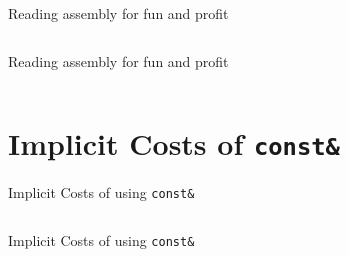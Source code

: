 \begin{frame}[fragile]{Reading assembly for fun and profit}
    \begin{columns}[t]
        \begin{column}{.45\textwidth}

        \end{column}
        \begin{column}{.45\textwidth}
        \end{column}
    \end{columns}

\end{frame}

\begin{frame}[fragile]{Reading assembly for fun and profit}
    \begin{columns}[t]
        \begin{column}{.45\textwidth}
        \end{column}
        \begin{column}{.45\textwidth}
        \end{column}
    \end{columns}
\end{frame}


\section{Implicit Costs of \texttt{const\&}}

\begin{frame}[fragile]{Implicit Costs of using \texttt{const\&}}
    \begin{columns}[t]
        \begin{column}{.45\textwidth}
        \end{column}
        \begin{column}{.45\textwidth}
        \end{column}
    \end{columns}
\end{frame}

\begin{frame}[fragile]{Implicit Costs of using \texttt{const\&}}
    \begin{columns}[t]
        \begin{column}{.45\textwidth}
        \end{column}
        \begin{column}{.45\textwidth}
        \end{column}
    \end{columns}
\end{frame}

